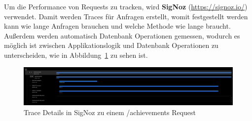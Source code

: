 Um die Performance von Requests zu tracken, wird \textbf{SigNoz} (\href{https://signoz.io/}{https://signoz.io/}) verwendet.
Damit werden Traces für Anfragen erstellt, womit festgestellt werden kann wie lange Anfragen brauchen und welche Methode wie lange braucht.
Außerdem werden automatisch Datenbank Operationen gemessen, wodurch es möglich ist zwischen Applikationslogik
und Datenbank Operationen zu unterscheiden, wie in Abbildung~\ref{fig:signoz-traces} zu sehen ist.
\begin{figure}
    \centering
    \includegraphics[width=\textwidth]{images/signoz_traces}
    \caption{Trace Details in SigNoz zu einem /achievements Request}
    \label{fig:signoz-traces}
\end{figure}
